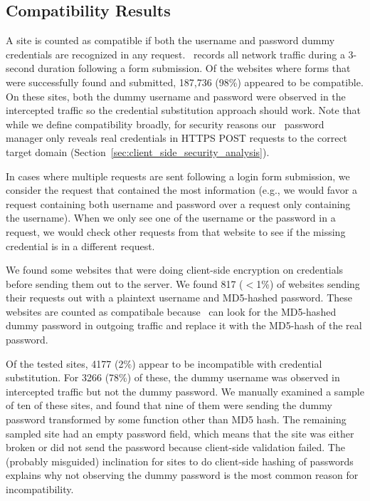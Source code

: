 \subsection{Compatibility Results} \label{finding_dummy_credentials}

A site is counted as compatible if both the username and password dummy credentials are recognized in any request. \SwapScan\ records all network traffic during a 3-second duration following a form submission. Of the websites where forms that were successfully found and submitted, 187,736 (98\%) appeared to be compatible. On these sites, both the dummy username and password were observed in the intercepted traffic so the credential substitution approach should work. Note that while we define compatibility broadly, for security reasons our \SecPass\ password manager only reveals real credentials in HTTPS POST requests to the correct target domain (Section~\ref{sec:client_side_security_analysis}). %

In cases where multiple requests are sent following a login form submission, we consider the request that contained the most information (e.g., we would favor a request containing both username and password over a request only containing the username). When we only see one of the username or the password in a request, we would check other requests from that website to see if the missing credential is in a different request.

We found some websites that were doing client-side encryption on credentials before sending them out to the server. We found 817 ($<$1\%) of websites sending their requests out with a plaintext username and MD5-hashed password. These websites are counted as compatibale because \SecPass\ can look for the MD5-hashed dummy password in outgoing traffic and replace it with the MD5-hash of the real password.

Of the tested sites, 4177 (2\%) appear to be incompatible with credential substitution.   %
For 3266 (78\%) of these, the dummy username was observed in intercepted traffic but not the dummy password. We manually examined a sample of ten of these sites, and found that nine of them were sending the dummy password transformed by some function other than MD5 hash.  The remaining sampled site had an empty password field, which means that the site was either broken or did not send the password because client-side validation failed. The (probably misguided) inclination for sites to do client-side hashing of passwords explains why not observing the dummy password is the most common reason for incompatibility.  

